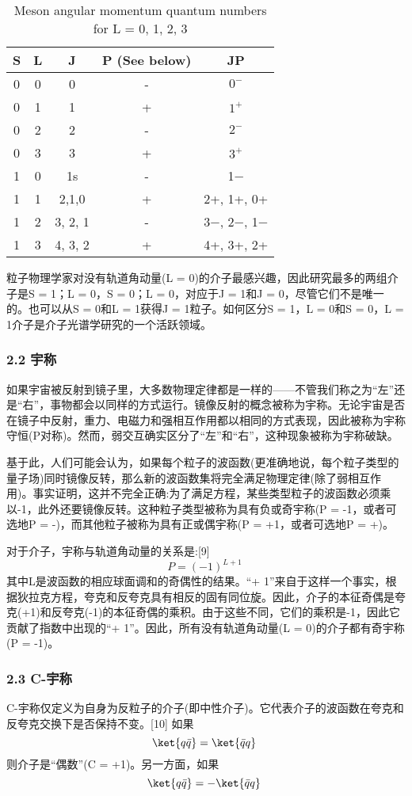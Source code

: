 \begin{table}[ht]
\centering
\caption{Meson angular momentum quantum numbers for L = 0, 1, 2, 3}\label{tab_JZ1}
\begin{tabular}{|c|c|c|c|c|}
\hline
S & L    & J & P
(See below) & JP \\
\hline
0 & 0& 0 & - &$ 0^-$\\
\hline
0 & 1 & 1& + & $1^+$ \\
\hline
0 & 2 & 2 & - & $2^-$ \\
\hline
0 & 3 & 3 & + &$3^+$ \\
\hline
1& 0 & 1s & - & 1− \\
\hline
1 &1 & 2,1,0 &+ & 2+, 1+, 0+\\
\hline
1 & 2 & 3, 2, 1 & - & 3−, 2−, 1−  \\
\hline
1 & 3 & 4, 3, 2 & +& 4+, 3+, 2+ \\
\hline
\end{tabular}
\end{table}
粒子物理学家对没有轨道角动量(L = 0)的介子最感兴趣，因此研究最多的两组介子是S = 1；L = 0，S = 0；L = 0，对应于J = 1和J = 0，尽管它们不是唯一的。也可以从S = 0和L = 1获得J = 1粒子。如何区分S = 1，L = 0和S = 0，L = 1介子是介子光谱学研究的一个活跃领域。
\subsubsection{2.2 宇称}
如果宇宙被反射到镜子里，大多数物理定律都是一样的——不管我们称之为“左”还是“右”，事物都会以同样的方式运行。镜像反射的概念被称为宇称。无论宇宙是否在镜子中反射，重力、电磁力和强相互作用都以相同的方式表现，因此被称为宇称守恒(P对称)。然而，弱交互确实区分了“左”和“右”，这种现象被称为宇称破缺。

基于此，人们可能会认为，如果每个粒子的波函数(更准确地说，每个粒子类型的量子场)同时镜像反转，那么新的波函数集将完全满足物理定律(除了弱相互作用)。事实证明，这并不完全正确:为了满足方程，某些类型粒子的波函数必须乘以-1，此外还要镜像反转。这种粒子类型被称为具有负或奇宇称(P = -1，或者可选地P = -)，而其他粒子被称为具有正或偶宇称(P = +1，或者可选地P = +)。

对于介子，宇称与轨道角动量的关系是:[9]\begin{equation}
P=(-1)^{L+1}~
\end{equation}
其中L是波函数的相应球面调和的奇偶性的结果。“+ 1”来自于这样一个事实，根据狄拉克方程，夸克和反夸克具有相反的固有同位旋。因此，介子的本征奇偶是夸克(+1)和反夸克(-1)的本征奇偶的乘积。由于这些不同，它们的乘积是-1，因此它贡献了指数中出现的“+ 1”。因此，所有没有轨道角动量(L = 0)的介子都有奇宇称(P = -1)。

\subsubsection{2.3 C-宇称}
C-宇称仅定义为自身为反粒子的介子(即中性介子)。它代表介子的波函数在夸克和反夸克交换下是否保持不变。[10] 如果\begin{equation}
\ket{q\bar q}=\ket{\bar q q}~
\end{equation}
则介子是“偶数”(C = +1)。另一方面，如果\begin{equation}
\ket{q\bar q}=-\ket{\bar q q}~
\end{equation}
